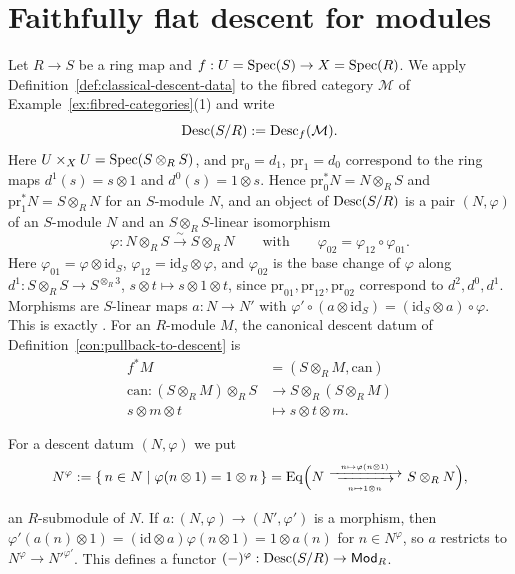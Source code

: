 \section{Faithfully flat descent for modules}\label{sec:fppf-descent-for-modules}


Let $R\to S$ be a ring map and $f:U=\operatorname{Spec}\!\left(S\right)\to X=\operatorname{Spec}\!\left(R\right)$. We apply Definition~\ref{def:classical-descent-data} to the fibred category $\mathcal{M}$ of Example~\ref{ex:fibred-categories}(1) and write
\[
\operatorname{Desc}(S/R):=\operatorname{Desc}_f(\mathcal{M}).
\]
Here $U\times_XU=\operatorname{Spec}\!\left(S\otimes_RS\right)$, and $\mathrm{pr}_0=d_1$, $\mathrm{pr}_1=d_0$ correspond to the ring maps $d^1(s)=s\otimes1$ and $d^0(s)=1\otimes s$. Hence $\mathrm{pr}_0^*N=N\otimes_RS$ and $\mathrm{pr}_1^*N=S\otimes_RN$ for an $S$-module $N$, and an object of $\operatorname{Desc}(S/R)$ is a pair $(N,\varphi)$ of an $S$-module $N$ and an $S\otimes_RS$-linear isomorphism
\[
\varphi:N\otimes_RS\xrightarrow{\ \sim\ }S\otimes_RN\qquad\text{with}\qquad\varphi_{02}=\varphi_{12}\circ\varphi_{01}.
\]
Here $\varphi_{01}=\varphi\otimes\mathrm{id}_S$, $\varphi_{12}=\mathrm{id}_S\otimes\varphi$, and $\varphi_{02}$ is the base change of $\varphi$ along $d^1:S\otimes_RS\to S^{\otimes_R3}$, $s\otimes t\mapsto s\otimes1\otimes t$, since $\mathrm{pr}_{01},\mathrm{pr}_{12},\mathrm{pr}_{02}$ correspond to $d^2,d^0,d^1$. Morphisms are $S$-linear maps $a:N\to N'$ with $\varphi'\circ(a\otimes\mathrm{id}_S)=(\mathrm{id}_S\otimes a)\circ\varphi$. This is exactly \cite[][Definition~35.3.1, Tag 023F]{stacks-project}. For an $R$-module $M$, the canonical descent datum of Definition~\ref{con:pullback-to-descent} is
\begin{align*}
	f^*M &= (S\otimes_RM,\mathrm{can})\\
	\mathrm{can}:(S\otimes_RM)\otimes_RS &\longrightarrow S\otimes_R(S\otimes_RM) \\
	s\otimes m\otimes t &\longmapsto s\otimes t\otimes m .
\end{align*}

For a descent datum $(N,\varphi)$ we put
\begin{align}\label{eq:eqalizer-submodule}
	N^\varphi:=\{\,n\in N\mid\varphi(n\otimes1)=1\otimes n\,\}=\Eq\Bigl(N\ \substack{\xrightarrow{\ n\mapsto\varphi(n\otimes1)\ }\\[-0.2em]\xrightarrow[\ n\mapsto1\otimes n\ ]{}}\ S\otimes_RN\Bigr),
\end{align}

an $R$-submodule of $N$. If $a:(N,\varphi)\to(N',\varphi')$ is a morphism, then $\varphi'(a(n)\otimes1)=(\mathrm{id}\otimes a)\varphi(n\otimes1)=1\otimes a(n)$ for $n\in N^\varphi$, so $a$ restricts to $N^\varphi\to N'^{\varphi'}$. This defines a functor $(-)^\varphi:\operatorname{Desc}(S/R)\to\mathsf{Mod}_R$.


